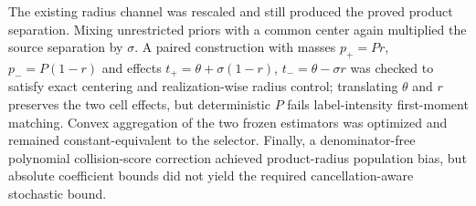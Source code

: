 The existing radius channel was rescaled and still produced the proved product separation.  Mixing unrestricted priors with a common center again multiplied the source separation by \(\sigma\).  A paired construction with masses \(p_+=Pr\), \(p_-=P(1-r)\) and effects \(t_+=\theta+\sigma(1-r)\), \(t_-=\theta-\sigma r\) was checked to satisfy exact centering and realization-wise radius control; translating \(\theta\) and \(r\) preserves the two cell effects, but deterministic \(P\) fails label-intensity first-moment matching.  Convex aggregation of the two frozen estimators was optimized and remained constant-equivalent to the selector.  Finally, a denominator-free polynomial collision-score correction achieved product-radius population bias, but absolute coefficient bounds did not yield the required cancellation-aware stochastic bound.